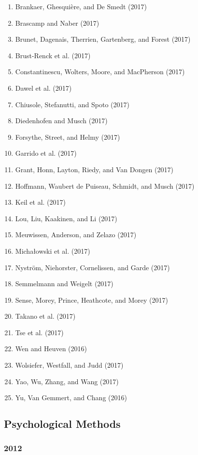 \documentclass[english,man]{apa6}
\providecommand{\tightlist}{%
  \setlength{\itemsep}{0pt}\setlength{\parskip}{0pt}}
\begin{document}
\begin{enumerate}
\def\labelenumi{\arabic{enumi})}
\tightlist
\item
  Brankaer, Ghesquière, and De Smedt (2017)
\item
  Brascamp and Naber (2017)
\item
  Brunet, Dagenais, Therrien, Gartenberg, and Forest (2017)
\item
  Brust-Renck et al. (2017)
\item
  Constantinescu, Wolters, Moore, and MacPherson (2017)
\item
  Dawel et al. (2017)
\item
  Chiusole, Stefanutti, and Spoto (2017)
\item
  Diedenhofen and Musch (2017)
\item
  Forsythe, Street, and Helmy (2017)
\item
  Garrido et al. (2017)
\item
  Grant, Honn, Layton, Riedy, and Van Dongen (2017)
\item
  Hoffmann, Waubert de Puiseau, Schmidt, and Musch (2017)
\item
  Keil et al. (2017)
\item
  Lou, Liu, Kaakinen, and Li (2017)
\item
  Meuwissen, Anderson, and Zelazo (2017)
\item
  Michałowski et al. (2017)
\item
  Nyström, Niehorster, Cornelissen, and Garde (2017)
\item
  Semmelmann and Weigelt (2017)
\item
  Sense, Morey, Prince, Heathcote, and Morey (2017)
\item
  Takano et al. (2017)
\item
  Tse et al. (2017)
\item
  Wen and Heuven (2016)
\item
  Wolsiefer, Westfall, and Judd (2017)
\item
  Yao, Wu, Zhang, and Wang (2017)
\item
  Yu, Van Gemmert, and Chang (2016)
\end{enumerate}

\subsection{Psychological Methods}\label{psychological-methods}

\subsubsection{2012}\label{section-34}
\end{document}
